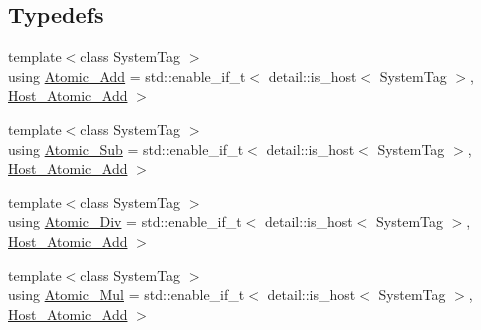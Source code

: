 \subsection*{Typedefs}
\begin{DoxyCompactItemize}
\item 
{\footnotesize template$<$class System\+Tag $>$ }\\using \hyperlink{namespaceBC_1_1oper_aca3a597a9ebcb5e6fa875a1a0b52d3ac}{Atomic\+\_\+\+Add} = std\+::enable\+\_\+if\+\_\+t$<$ detail\+::is\+\_\+host$<$ System\+Tag $>$, \hyperlink{structBC_1_1oper_1_1Host__Atomic__Add}{Host\+\_\+\+Atomic\+\_\+\+Add} $>$
\item 
{\footnotesize template$<$class System\+Tag $>$ }\\using \hyperlink{namespaceBC_1_1oper_aa1af7d6c0a6282ac0f17e77d125eb351}{Atomic\+\_\+\+Sub} = std\+::enable\+\_\+if\+\_\+t$<$ detail\+::is\+\_\+host$<$ System\+Tag $>$, \hyperlink{structBC_1_1oper_1_1Host__Atomic__Add}{Host\+\_\+\+Atomic\+\_\+\+Add} $>$
\item 
{\footnotesize template$<$class System\+Tag $>$ }\\using \hyperlink{namespaceBC_1_1oper_aececff80cbd6fbd7c83446b354dc303e}{Atomic\+\_\+\+Div} = std\+::enable\+\_\+if\+\_\+t$<$ detail\+::is\+\_\+host$<$ System\+Tag $>$, \hyperlink{structBC_1_1oper_1_1Host__Atomic__Add}{Host\+\_\+\+Atomic\+\_\+\+Add} $>$
\item 
{\footnotesize template$<$class System\+Tag $>$ }\\using \hyperlink{namespaceBC_1_1oper_abd0077be15aa6230d105ec70a2364997}{Atomic\+\_\+\+Mul} = std\+::enable\+\_\+if\+\_\+t$<$ detail\+::is\+\_\+host$<$ System\+Tag $>$, \hyperlink{structBC_1_1oper_1_1Host__Atomic__Add}{Host\+\_\+\+Atomic\+\_\+\+Add} $>$
\end{DoxyCompactItemize}
